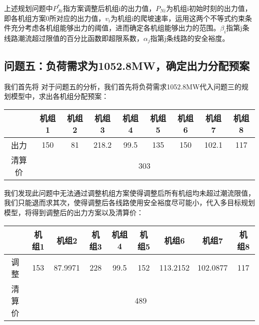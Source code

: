 \documentclass[12pt,a4paper]{ctexart}
\begin{document}
	上述规划问题中$P_{Ai}^{*}$指方案调整后机组i的出力值，$P_{Ni}$为机组i初始时刻的出力值，即各机组方案0所对应的出力值，$v_{i}$为机组i的爬坡速率，运用这两个不等式约束条件充分考虑各机组能够出力的阈值，进而确定各机组能够出力的范围。$\beta_{i}$指第j条线路潮流超过限值的百分比函数即超限系数，$\alpha_{j}$指第j条线路的安全裕度。

	\subsection{问题五：负荷需求为1052.8MW，确定出力分配预案}	我们首先将
	对于问题五的分析，我们首先将负荷需求1052.8MW代入问题三的规划模型中，求出各机组分配预案：
	
\vspace{1em}
	\begin{adjustbox}{center}
		\begin{tabular}{|c|c|c|c|c|c|c|c|c|}
			\hline
			\textbf{}    & {机组1} & {机组2} & {机组3} & {机组4} & {机组5} & {机组6} & {机组7} &{机组8} \\ \hline
			{出力}  & 150          & 81           & 218.2          & 99.5         & 135          & 150          & 102.1           & 117        \\ \hline
			{清算价} & \multicolumn{8}{c|}{303}                                                                                              \\ \hline
		\end{tabular}
	\end{adjustbox}
\vspace{1em}
	
	我们发现此问题中无法通过调整机组方案使得调整后所有机组均未超过潮流限值，我们只能退而求其次，使得调整后各线路使用安全裕度尽可能小，代入多目标规划模型，将得到调整后的出力方案以及清算价：
	
\vspace{1em}

	\begin{adjustbox}{center}
		\begin{tabular}{|c|c|c|c|c|c|c|c|c|}
			\hline
			& {机组1} & {机组2} & {机组3} & {机组4} & {机组5} & {机组6} &{机组7} & {机组8} \\
			\hline
			{调整} & 153    & 87.9971           & 228     & 99.5           & 152     & 113.2152      & 102.0877      & 117 \\
			\hline
			{清算价} & \multicolumn{8}{c|}{489}                                                                                              \\ \hline 
		\end{tabular}
	\end{adjustbox}
\end{document}
